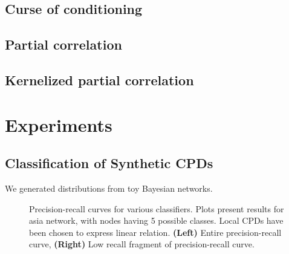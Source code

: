 \documentclass{article} %
\begin{document}
\subsection{Curse of conditioning}

\subsection{Partial correlation}

\subsection{Kernelized partial correlation}

\section{Experiments}

\subsection{Classification of Synthetic CPDs}
We generated distributions from toy Bayesian networks.

\begin{figure}[h]
\centering
{}
\caption{Precision-recall curves for various classifiers. Plots present
results for asia network, with nodes having 5 possible classes. Local CPDs
have been chosen to express linear relation. {\bf (Left)} Entire 
precision-recall curve, {\bf (Right)} Low recall fragment of precision-recall curve.}

\end{figure}
\end{document}
